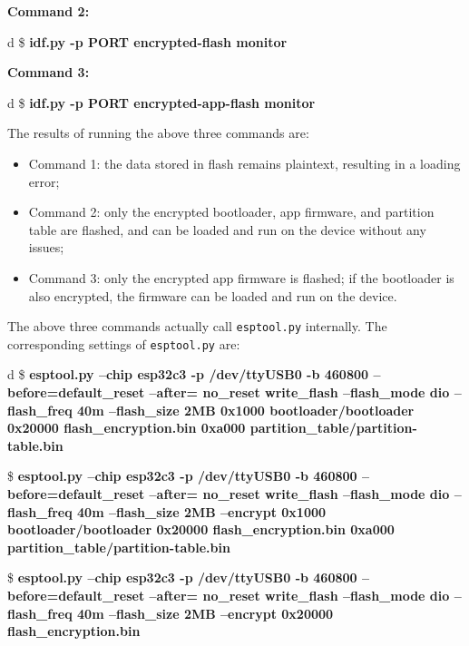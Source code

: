 \documentclass[a4paper,12pt]{book}
\begin{document}
\textbf{Command 2:}

\begin{codebloc}
\begin{tabular}{d}
\$ \textbf{idf.py -p PORT encrypted-flash monitor}
\end{tabular}
\end{codebloc}

\textbf{Command 3:}

\begin{codebloc}
\begin{tabular}{d}
\$ \textbf{idf.py -p PORT encrypted-app-flash monitor}
\end{tabular}
\end{codebloc}

The results of running the above three commands are:

\begin{itemize}[leftmargin=1.5em,noitemsep]
    \item Command 1: the data stored in flash remains plaintext, resulting in a loading error;
    \item Command 2: only the encrypted bootloader, app firmware, and partition table are flashed, and can be loaded and run on the device without any issues;
    \item Command 3: only the encrypted app firmware is flashed; if the bootloader is also encrypted, the firmware can be loaded and run on the device.
\end{itemize}

The above three commands actually call \verb|esptool.py| internally. The corresponding settings of \verb|esptool.py| are:

\begin{codebloc}
\begin{tabular}{d}
\$ \textbf{esptool.py --chip esp32c3 -p /dev/ttyUSB0 -b 460800 --before=default\_reset --after= no\_reset write\_flash --flash\_mode dio --flash\_freq 40m --flash\_size 2MB 0x1000 bootloader/bootloader 0x20000 flash\_encryption.bin 0xa000 partition\_table/partition-table.bin}

\vspace{12pt}
\$ \textbf{esptool.py --chip esp32c3 -p /dev/ttyUSB0 -b 460800 --before=default\_reset --after= no\_reset write\_flash --flash\_mode dio --flash\_freq 40m --flash\_size 2MB --encrypt 0x1000 bootloader/bootloader 0x20000 flash\_encryption.bin 0xa000 partition\_table/partition-table.bin}

\vspace{12pt}
\$ \textbf{esptool.py --chip esp32c3 -p /dev/ttyUSB0 -b 460800 --before=default\_reset --after= no\_reset write\_flash --flash\_mode dio --flash\_freq 40m --flash\_size 2MB --encrypt 0x20000 flash\_encryption.bin}
\end{tabular}
\end{codebloc}
\end{document}
